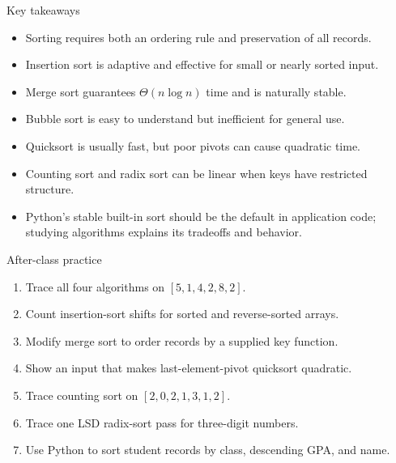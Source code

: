 \documentclass[aspectratio=169]{beamer}
\begin{document}
\begin{frame}{Key takeaways}
  \begin{itemize}
    \item Sorting requires both an ordering rule and preservation of all records.
    \item Insertion sort is adaptive and effective for small or nearly sorted input.
    \item Merge sort guarantees $\Theta(n\log n)$ time and is naturally stable.
    \item Bubble sort is easy to understand but inefficient for general use.
    \item Quicksort is usually fast, but poor pivots can cause quadratic time.
    \item Counting sort and radix sort can be linear when keys have restricted structure.
    \item Python's stable built-in sort should be the default in application code;
      studying algorithms explains its tradeoffs and behavior.
  \end{itemize}
\end{frame}

\begin{frame}{After-class practice}
  \begin{enumerate}
    \item Trace all four algorithms on $[5,1,4,2,8,2]$.
    \item Count insertion-sort shifts for sorted and reverse-sorted arrays.
    \item Modify merge sort to order records by a supplied key function.
    \item Show an input that makes last-element-pivot quicksort quadratic.
    \item Trace counting sort on $[2,0,2,1,3,1,2]$.
    \item Trace one LSD radix-sort pass for three-digit numbers.
    \item Use Python to sort student records by class, descending GPA, and name.
  \end{enumerate}
\end{frame}
\end{document}
